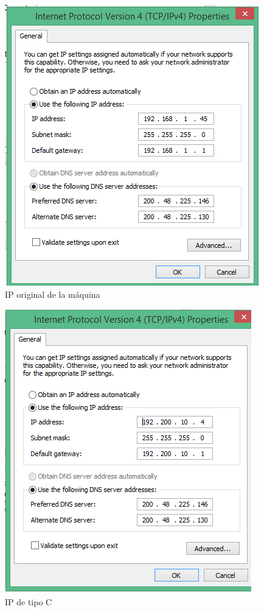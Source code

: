 \documentclass[a4paper,12pt]{article}
\begin{document}
 \begin{figure}[H]
  \centering
  \includegraphics[scale = 0.5]{5.png}
  \caption{IP original de la máquina}
 \end{figure}
 
 \begin{figure}[H]
  \centering
  \includegraphics[scale = 0.5]{6.png}
  \caption{IP de tipo C}
 \end{figure}
 
\end{document}
